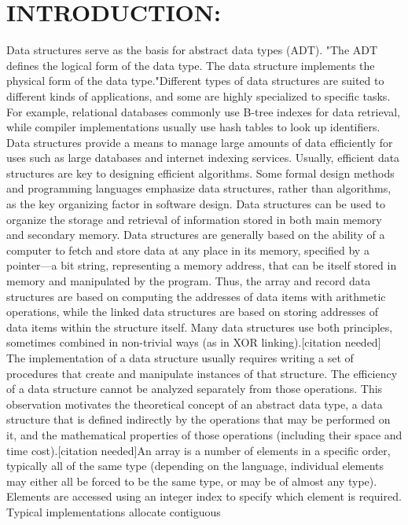 \documentclass{article}
\begin{document}
\section*{INTRODUCTION:}
Data structures serve as the basis for abstract data
types (ADT). "The ADT defines the logical form of
the data type. The data structure implements the
physical form of the data type."Different types of data
structures are suited to different kinds of applications,
and some are highly specialized to specific tasks. For
example, relational databases commonly use B-tree
indexes for data retrieval, while compiler
implementations usually use hash tables to look up
identifiers. Data structures provide a means to manage
large amounts of data efficiently for uses such as large
databases and internet indexing services. Usually,
efficient data structures are key to designing efficient
algorithms. Some formal design methods and
programming languages emphasize data structures,
rather than algorithms, as the key organizing factor in
software design. Data structures can be used to
organize the storage and retrieval of information
stored in both main memory and secondary memory.
Data structures are generally based on the ability of a 
computer to fetch and store data at any place in its
memory, specified by a pointer—a bit string,
representing a memory address, that can be itself
stored in memory and manipulated by the program.
Thus, the array and record data structures are based on
computing the addresses of data items with arithmetic
operations, while the linked data structures are based
on storing addresses of data items within the structure
itself. Many data structures use both principles,
sometimes combined in non-trivial ways (as in XOR
linking).[citation needed]
The implementation of a data structure usually
requires writing a set of procedures that create and
manipulate instances of that structure. The efficiency
of a data structure cannot be analyzed separately from
those operations. This observation motivates the
theoretical concept of an abstract data type, a data
structure that is defined indirectly by the operations
that may be performed on it, and the mathematical
properties of those operations (including their space
and time cost).[citation needed]An array is a number
of elements in a specific order, typically all of the
same type (depending on the language, individual
elements may either all be forced to be the same type,
or may be of almost any type). Elements are accessed
using an integer index to specify which element is
required. Typical implementations allocate contiguous
\end{document}
